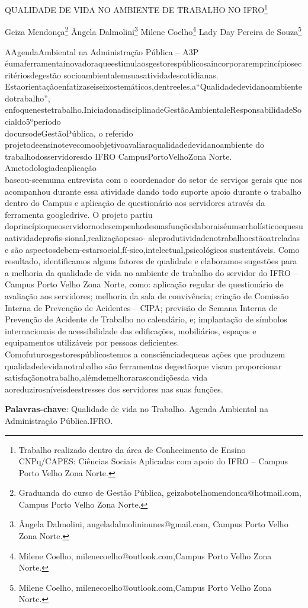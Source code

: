 \documentclass[article,12pt,onesidea,4paper,english,brazil]{abntex2}
\begin{document}
	
	
	\frenchspacing 
	
	\begin{center}
		\LARGE QUALIDADE DE VIDA NO AMBIENTE DE TRABALHO NO IFRO\footnote{Trabalho realizado dentro da área de Conhecimento de Ensino CNPq/CAPES: Ciências Sociais Aplicadas com apoio do IFRO – Campus Porto Velho Zona Norte.}
		
		\normalsize
		Geiza Mendonça\footnote{Graduanda do curso de Gestão Pública, geizabotelhomendonca@hotmail.com, Campus Porto Velho Zona Norte.} 
		Ângela Dalmolini\footnote{Ângela Dalmolini, angeladalmolininunes@gmail.com, Campus Porto Velho Zona Norte.}
		Milene Coelho\footnote{Milene Coelho, milenecoelho@outlook.com,Campus Porto Velho Zona Norte.}
		Lady Day Pereira de Souza\footnote{Milene Coelho, milenecoelho@outlook.com,Campus Porto Velho Zona Norte.} 
	\end{center}
	
	\noindent  AAgendaAmbiental na Administração Pública – A3P éumaferramentainovadoraqueestimulaosgestorespúblicosaincorporaremprincípiosecritériosdegestão socioambientalemsuasatividadescotidianas.
	Estaorientaçãoenfatizaseiseixostemáticos,dentreeles,a“Qualidadedevidanoambientedotrabalho”,
	enfoquenestetrabalho.IniciadonadisciplinadeGestãoAmbientaleResponsabilidadeSocialdo5ºperíodo
	\\docursodeGestãoPública, o referido projetodeensinotevecomoobjetivoavaliaraqualidadedevidanoambiente do trabalhodosservidoresdo IFRO CampusPortoVelhoZona Norte. Ametodologiadeaplicação\\baseou-seemuma entrevista com o coordenador do setor de serviços gerais que nos acompanhou durante essa atividade dando todo suporte apoio durante o trabalho dentro do Campus e aplicação de questionário aos servidores através da ferramenta googledrive. O projeto partiu doprincípioqueoservidornodesempenhodesuasfunçõeslaboraiséumserholísticoequesuaatividadeprofis-sional,realizaçãopesso- aleprodutividadenotrabalhoestãoatreladas e são aspectosdebem-estarsocial,fí-sico,intelectual,psicológicos sustentáveis. Como resultado, identificamos alguns fatores de qualidade e elaboramos sugestões para a melhoria da qualidade de vida no ambiente de trabalho do servidor do IFRO – Campus Porto Velho Zona Norte, como: aplicação regular de questionário de avaliação aos servidores; melhoria da sala de convivência; criação de Comissão Interna de Prevenção de Acidentes – CIPA; previsão de Semana Interna de Prevenção de Acidente de Trabalho no calendário, e; implantação de símbolos internacionais de acessibilidade das edificações, mobiliários, espaços e equipamentos utilizáveis por pessoas deficientes. Comofuturosgestorespúblicostemos a consciênciadequeas ações que produzem qualidadedevidanotrabalho são ferramentas degestãoque visam proporcionar satisfaçãonotrabalho,alémdemelhorarascondiçõesda vida aoreduzirosníveisdeestresses dos servidores nas suas funções.
	
	\vspace{\onelineskip}
	
	\noindent
	\textbf{Palavras-chave}: Qualidade de vida no Trabalho. Agenda Ambiental na Administração Pública.IFRO.
	
\end{document}
